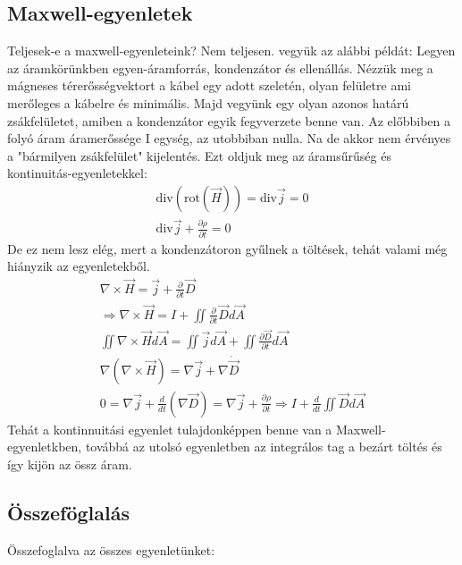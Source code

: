 \documentclass{article}
\begin{document}
\subsection{Maxwell-egyenletek}
Teljesek-e a maxwell-egyenleteink? Nem teljesen. vegyük az alábbi példát: Legyen az áramkörünkben egyen-áramforrás, kondenzátor és ellenállás. Nézzük meg a mágneses térerősségvektort a kábel egy adott szeletén, olyan felületre ami merőleges a kábelre és minimális. Majd vegyünk egy olyan azonos határú zsákfelületet, amiben a kondenzátor egyik fegyverzete benne van. Az előbbiben a folyó áram áramerőssége I egység, az utobbiban nulla. Na de akkor nem érvényes a "bármilyen zsákfelület" kijelentés. Ezt oldjuk meg az áramsűrűség és kontinuitás-egyenletekkel:
\begin{gather*}
\mathrm{div} (\mathrm{rot} (\vec{H}) ) = \mathrm{div} \vec{j} = 0 \\
\mathrm{div} \vec{j}  + \frac{\partial \rho}{\partial t} = 0
\end{gather*}
De ez nem lesz elég, mert a kondenzátoron gyűlnek a töltések, tehát valami még hiányzik az egyenletekből.
\begin{gather*}
\nabla \times \vec{H} = \vec{j} + \frac{\partial }{\partial t} \vec{D} \\
\Rightarrow \nabla \times \vec{H} = I+\iint \frac{\partial}{\partial t}\vec{D} d\vec{A} \\
\iint \nabla \times \vec{H} d\vec{A} = \iint \vec{j} d\vec{A} + \iint \frac{\partial \vec{D}}{\partial t} d\vec{A} \\
\nabla (\nabla \times \vec{H}) = \nabla \vec{j} +\nabla \dot{\vec{D}} \\
0= \nabla \vec{j} + \frac{d}{dt} (\nabla \vec{D}) = \nabla \vec{j} + \frac{\partial \rho}{\partial t} \Rightarrow I+ \frac{d}{dt} \iint \vec{D} d\vec{A}
\end{gather*}
Tehát a kontinnuitási egyenlet tulajdonképpen benne van a Maxwell-egyenletkben, továbbá az utolsó egyenletben az integrálos tag a bezárt töltés és így kijön az össz áram.
\subsection{Összeföglalás}
Összefoglalva az összes egyenletünket: 
\end{document}
